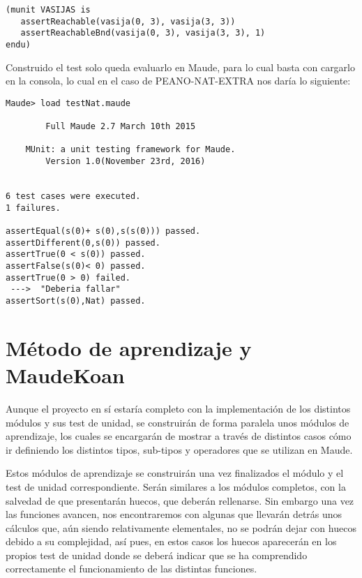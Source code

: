 {\codesize
\begin{verbatim}
(munit VASIJAS is
   assertReachable(vasija(0, 3), vasija(3, 3))
   assertReachableBnd(vasija(0, 3), vasija(3, 3), 1)
endu)
\end{verbatim}
}

Construido el test solo queda evaluarlo en Maude, para lo cual basta con cargarlo en la consola, lo cual en el caso de PEANO-NAT-EXTRA nos daría lo siguiente:\par

{\codesize
\begin{verbatim}
Maude> load testNat.maude

	    Full Maude 2.7 March 10th 2015

	MUnit: a unit testing framework for Maude.
		Version 1.0(November 23rd, 2016)


6 test cases were executed.
1 failures.

assertEqual(s(0)+ s(0),s(s(0))) passed.
assertDifferent(0,s(0)) passed.
assertTrue(0 < s(0)) passed.
assertFalse(s(0)< 0) passed.
assertTrue(0 > 0) failed.
 --->  "Deberia fallar"
assertSort(s(0),Nat) passed.
\end{verbatim}
}

\section{Método de aprendizaje y MaudeKoan}

Aunque el proyecto en sí estaría completo con la implementación de los distintos módulos y sus test de unidad, se construirán de forma paralela unos módulos de aprendizaje, los cuales se encargarán de mostrar a través de distintos casos cómo ir definiendo los distintos tipos, sub-tipos y operadores que se utilizan en Maude.\par

Estos módulos de aprendizaje se construirán una vez finalizados el módulo y el test de unidad correspondiente. Serán similares a los módulos completos, con la salvedad de que presentarán huecos, que deberán rellenarse. Sin embargo una vez las funciones avancen, nos encontraremos con algunas que llevarán detrás unos cálculos que, aún siendo relativamente elementales, no se podrán dejar con huecos debido a su complejidad, así pues, en estos casos los huecos aparecerán en los propios test de unidad donde se deberá indicar que se ha comprendido correctamente el funcionamiento de las distintas funciones. \par

